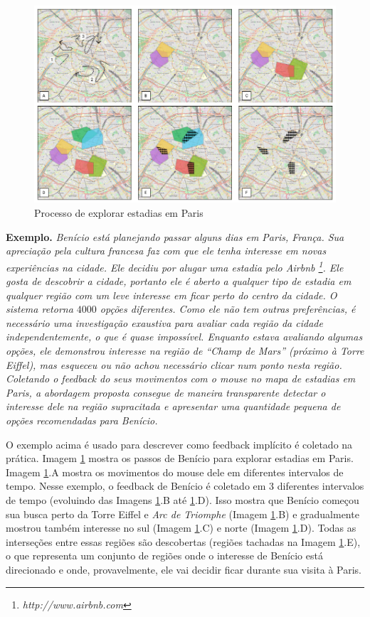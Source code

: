 \begin{figure}[t]
	\centering
	\includegraphics[width=\textwidth]{imagens/caso-de-estudo}
	\caption{Processo de explorar estadias em Paris}
	\label{fig:regions}
\end{figure}

{\bf Exemplo.} {\em Benício está planejando passar alguns dias em Paris, França. Sua apreciação pela cultura francesa faz com que ele tenha interesse em novas experiências na cidade. Ele decidiu por alugar uma estadia pelo Airbnb \footnote{\it http://www.airbnb.com}. Ele gosta de descobrir a cidade, portanto ele é aberto a qualquer tipo de estadia em qualquer região com um leve interesse em ficar perto do centro da cidade. O sistema retorna $4000$ opções diferentes. Como ele não tem outras preferências, é necessário uma investigação exaustiva para avaliar cada região da cidade independentemente, o que é quase impossível. Enquanto estava avaliando algumas opções, ele demonstrou interesse na região de  ``Champ de Mars'' (próximo à Torre Eiffel), mas esqueceu ou não achou necessário clicar num ponto nesta região. Coletando o feedback do seus movimentos com o mouse no mapa de estadias em Paris, a abordagem proposta consegue de maneira transparente detectar o interesse dele na região supracitada e apresentar uma quantidade pequena de opções recomendadas para Benício.}

O exemplo acima é usado para descrever como feedback implícito é coletado na prática. Imagem \ref{fig:regions} mostra os passos de Benício para explorar estadias em Paris. Imagem \ref{fig:regions}.A mostra os movimentos do mouse dele em diferentes intervalos de tempo. Nesse exemplo, o feedback de Benício é coletado em 3 diferentes intervalos de tempo (evoluindo das Imagens \ref{fig:regions}.B até \ref{fig:regions}.D). Isso mostra que Benício começou sua busca perto da Torre Eiffel e {\em Arc de Triomphe} (Imagem \ref{fig:regions}.B) e gradualmente mostrou também interesse no sul (Imagem \ref{fig:regions}.C) e norte (Imagem \ref{fig:regions}.D). Todas as interseções entre essas regiões são descobertas (regiões tachadas na Imagem \ref{fig:regions}.E), o que representa um conjunto de regiões onde o interesse de Benício está direcionado e onde, provavelmente, ele vai decidir ficar durante sua visita à Paris.

